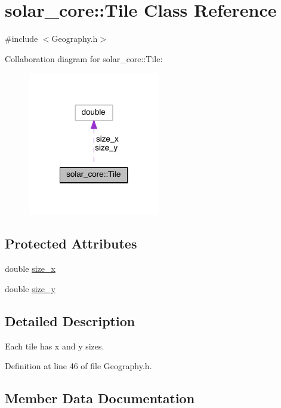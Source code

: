 \hypertarget{classsolar__core_1_1_tile}{}\section{solar\+\_\+core\+:\+:Tile Class Reference}
\label{classsolar__core_1_1_tile}


{\ttfamily \#include $<$Geography.\+h$>$}



Collaboration diagram for solar\+\_\+core\+:\+:Tile\+:
\nopagebreak
\begin{figure}[H]
\begin{center}
\leavevmode
\includegraphics[width=164pt]{classsolar__core_1_1_tile__coll__graph}
\end{center}
\end{figure}
\subsection*{Protected Attributes}
\begin{DoxyCompactItemize}
\item 
double \hyperlink{classsolar__core_1_1_tile_ae8615b87d6d0c614de01b497fa63c27b}{size\+\_\+x}
\item 
double \hyperlink{classsolar__core_1_1_tile_a698ac57539f58ed4e0a54b3135be6fb9}{size\+\_\+y}
\end{DoxyCompactItemize}


\subsection{Detailed Description}
Each tile has x and y sizes. 

Definition at line 46 of file Geography.\+h.



\subsection{Member Data Documentation}
\hypertarget{classsolar__core_1_1_tile_ae8615b87d6d0c614de01b497fa63c27b}{}
